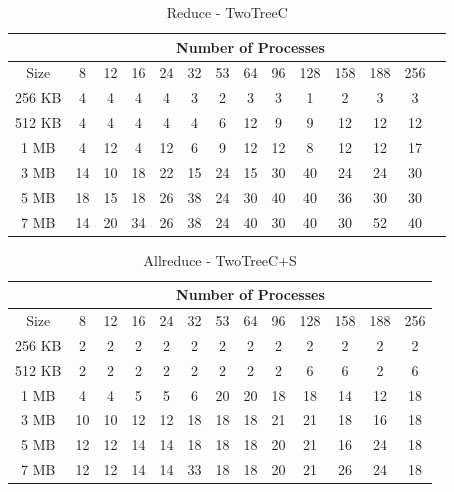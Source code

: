 \documentclass[sigplan,review,anonymous]{acmart}\settopmatter{printfolios=true,printccs=false,printacmref=false}
\begin{document}
\begin{table}[]
\caption{Reduce - TwoTreeC}
\begin{center}
\begin{tabular}{|c|c|c|c|c|c|c|c|c|c|c|c|c|c|}
\hline
& \multicolumn{12}{c|}{Number of Processes} \\
\hline
Size & 8 & 12 & 16 & 24 & 32 & 53 & 64 & 96 & 128 & 158 & 188 & 256\\
\hline
 256 KB & 4 & 4 & 4 & 4 & 3 & 2 & 3 & 3 & 1 & 2 & 3 & 3\\
 512 KB & 4 & 4 & 4 & 4 & 4 & 6 & 12 & 9 & 9 & 12 & 12 & 12\\
 1 MB & 4 & 12 & 4 & 12 & 6 & 9 & 12 & 12 & 8 & 12 & 12 & 17\\
 3 MB & 14 & 10 & 18 & 22 & 15 & 24 & 15 & 30 & 40 & 24 & 24 & 30\\
 5 MB & 18 & 15 & 18 & 26 & 38 & 24 & 30 & 40 & 40 & 36 & 30 & 30\\
 7 MB & 14 & 20 & 34 & 26 & 38 & 24 & 40 & 30 & 40 & 30 & 52 & 40\\
\hline
\end{tabular}
\end{center}
\end{table}

\begin{table}[]
\caption{Allreduce - TwoTreeC+S}
\begin{center}
\begin{tabular}{|c|c|c|c|c|c|c|c|c|c|c|c|c|}
\hline
 & \multicolumn{12}{c|}{Number of Processes} \\
\hline
 Size & 8 & 12 & 16 & 24 & 32 & 53 & 64 & 96 & 128 & 158 & 188 & 256\\
\hline
 256 KB & 2 & 2 & 2 & 2 & 2 & 2 & 2 & 2 & 2 & 2 & 2 & 2\\
 512 KB & 2 & 2 & 2 & 2 & 2 & 2 & 2 & 2 & 6 & 6 & 2 & 6\\
 1 MB & 4 & 4 & 5 & 5 & 6 & 20 & 20 & 18 & 18 & 14 & 12 & 18\\
 3 MB & 10 & 10 & 12 & 12 & 18 & 18 & 18 & 21 & 21 & 18 & 16 & 18\\
 5 MB & 12 & 12 & 14 & 14 & 18 & 18 & 18 & 20 & 21 & 16 & 24 & 18\\
 7 MB & 12 & 12 & 14 & 14 & 33 & 18 & 18 & 20 & 21 & 26 & 24 & 18\\
\hline
\end{tabular}
\end{center}
\end{table}

\end{document}
